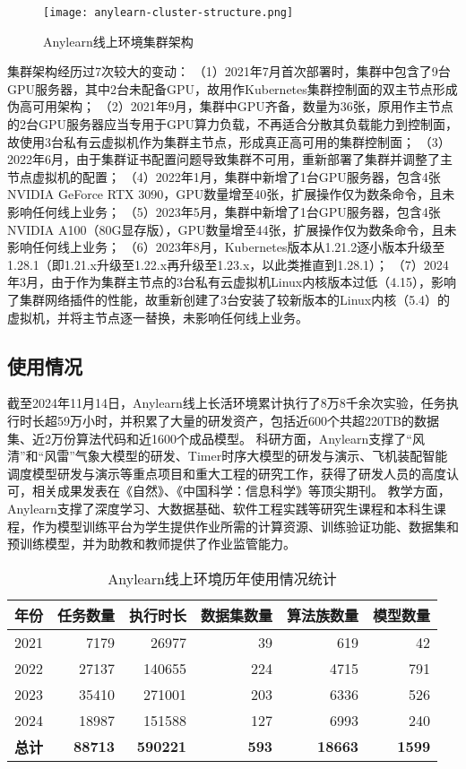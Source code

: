 \begin{figure}
  \centering
  \texttt{[image: anylearn-cluster-structure.png]}
  \caption{Anylearn线上环境集群架构}
  \label{fig:cluster}
\end{figure}

集群架构经历过7次较大的变动：
（1）2021年7月首次部署时，集群中包含了9台GPU服务器，其中2台未配备GPU，故用作Kubernetes集群控制面的双主节点形成伪高可用架构；
（2）2021年9月，集群中GPU齐备，数量为36张，原用作主节点的2台GPU服务器应当专用于GPU算力负载，不再适合分散其负载能力到控制面，故使用3台私有云虚拟机作为集群主节点，形成真正高可用的集群控制面； 
（3）2022年6月，由于集群证书配置问题导致集群不可用，重新部署了集群并调整了主节点虚拟机的配置；
（4）2022年1月，集群中新增了1台GPU服务器，包含4张NVIDIA GeForce RTX 3090，GPU数量增至40张，扩展操作仅为数条命令，且未影响任何线上业务；
（5）2023年5月，集群中新增了1台GPU服务器，包含4张NVIDIA A100（80G显存版），GPU数量增至44张，扩展操作仅为数条命令，且未影响任何线上业务；
（6）2023年8月，Kubernetes版本从1.21.2逐小版本升级至1.28.1（即1.21.x升级至1.22.x再升级至1.23.x，以此类推直到1.28.1）；
（7）2024年3月，由于作为集群主节点的3台私有云虚拟机Linux内核版本过低（4.15），影响了集群网络插件的性能，故重新创建了3台安装了较新版本的Linux内核（5.4）的虚拟机，并将主节点逐一替换，未影响任何线上业务。

\subsection{使用情况}
截至2024年11月14日，Anylearn线上长活环境累计执行了8万8千余次实验，任务执行时长超59万小时，并积累了大量的研发资产，包括近600个共超220TB的数据集、近2万份算法代码和近1600个成品模型。
科研方面，Anylearn支撑了“风清”和“风雷”气象大模型的研发、Timer时序大模型的研发与演示、飞机装配智能调度模型研发与演示等重点项目和重大工程的研究工作，获得了研发人员的高度认可，相关成果发表在《自然》\cite{Zha23}、《中国科学：信息科学》\cite{Zho24}等顶尖期刊。
教学方面，Anylearn支撑了深度学习、大数据基础、软件工程实践等研究生课程和本科生课程，作为模型训练平台为学生提供作业所需的计算资源、训练验证功能、数据集和预训练模型，并为助教和教师提供了作业监管能力。

\begin{table}
  \centering
  \caption{Anylearn线上环境历年使用情况统计}
  \begin{tabular}{crrrrr}
    \toprule
    \multicolumn{1}{c}{年份} & \multicolumn{1}{c}{任务数量} & \multicolumn{1}{c}{执行时长} & \multicolumn{1}{c}{数据集数量} & \multicolumn{1}{c}{算法族数量} & \multicolumn{1}{c}{模型数量} \\
    \midrule
    2021 & 7179 & 26977 & 39 & 619 & 42 \\
    2022 & 27137 & 140655 & 224 & 4715 & 791 \\
    2023 & 35410 & 271001 & 203 & 6336 & 526 \\
    2024 & 18987 & 151588 & 127 & 6993 & 240 \\
    \textbf{总计} & \textbf{88713} & \textbf{590221} & \textbf{593} & \textbf{18663} & \textbf{1599} \\
    \bottomrule
  \end{tabular}
  \label{tab:stats}
\end{table}

